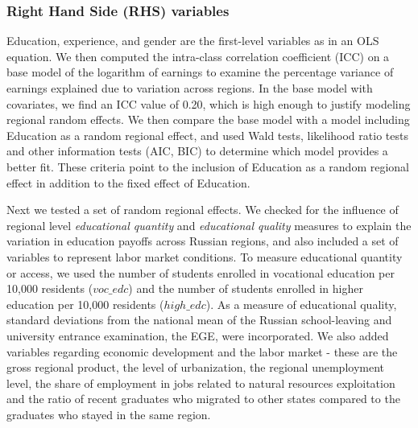 \documentclass[alpha-refs]{wiley-article-03v}
\begin{document}
\subsubsection{Right Hand Side (RHS) variables}
Education, experience, and gender are the first-level variables as in an OLS equation. We then computed the intra-class correlation coefficient (ICC) on a base model of the logarithm of earnings  to examine the percentage variance of earnings explained due to variation across regions. In the base model with covariates, we find an ICC value of 0.20, which is high enough to justify modeling regional random effects. We then compare the base model with a model including Education as a random regional effect, and used Wald tests, likelihood ratio tests and other information tests (AIC, BIC) to determine which model provides a better fit. These criteria point to the inclusion of Education as a random regional effect in addition to the fixed effect of Education. 


Next we tested a set of random regional effects. We checked for the influence of regional level \textit{educational quantity} and \textit{educational quality} measures to explain the variation in education payoffs across Russian regions, and also included a set of variables to represent labor market conditions. To measure educational quantity or access, we used the number of students enrolled in vocational education per 10,000 residents ($voc\_edc$) and the number of students enrolled in higher education per 10,000 residents ($high\_edc$). As a measure of educational quality, standard deviations from the national mean of the Russian school-leaving and university entrance examination, the EGE, were incorporated. We also added variables regarding economic development and the labor market - these are the gross regional product, the level of urbanization, the regional unemployment level, the share of employment in jobs related to natural resources exploitation and the ratio of recent graduates who migrated to other states compared to the graduates who stayed in the same region. 


\vspace{-0.2in}
\end{document}
